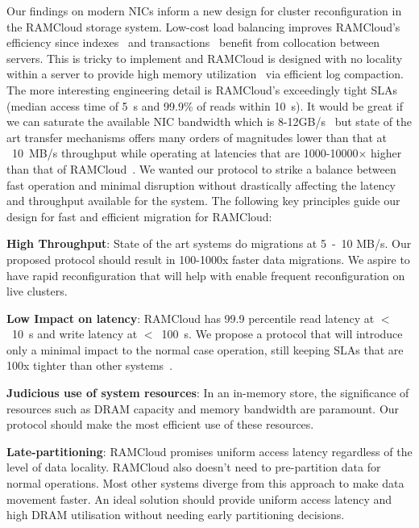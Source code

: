Our findings on modern NICs inform a new design for cluster reconfiguration
in the RAMCloud storage system. Low-cost load balancing improves RAMCloud’s
efficiency since indexes~\cite{slik} and transactions~\cite{ramcloudtx} benefit from collocation between servers.
This is tricky to implement and RAMCloud is designed with no locality within a 
server to provide high memory utilization~\cite{ramcloudfast} via efficient log compaction.
The more interesting engineering detail is RAMCloud’s exceedingly tight SLAs (median
access time of 5~\textmu s and 99.9\% of reads within 10~\textmu s). It would be great if we can saturate the
available NIC bandwidth which is 8-12GB/s~\cite{cx3,cx4} but state of the art 
transfer mechanisms offers many orders of magnitudes lower than that at ~10~MB/s 
throughput while operating at latencies that are 1000-10000$\times$ higher than that of RAMCloud~\cite{ramcloud}.
We wanted our protocol to strike a balance between fast operation and minimal disruption without drastically affecting
the latency and throughput available for the system. The following key principles guide our design for fast and 
efficient migration for RAMCloud:
\begin{myitemize}
\item{\textbf{High Throughput}}: State of the art systems do migrations at 5~-~10 MB/s. Our proposed protocol
should result in 100-1000x faster data migrations. We aspire to have rapid reconfiguration that will 
help with enable frequent reconfiguration on live clusters.
\item{\textbf{Low Impact on latency}}: RAMCloud has 99.9 percentile read latency at $<$~10~\textmu s \linebreak and write latency
at $<$~100~\textmu s. We propose a protocol that will introduce only a minimal impact to the normal case operation, still keeping
SLAs that are 100x tighter \linebreak than other systems~\cite{squall}.
\item{\textbf{Judicious use of system resources}}: In an in-memory store, the significance of \linebreak resources such as DRAM capacity and
memory bandwidth are paramount. Our \linebreak protocol should make the most efficient use of these resources.
\item{\textbf{Late-partitioning}}: RAMCloud promises uniform access latency regardless of the level of data locality.
RAMCloud also doesn't need to pre-partition data for normal operations. Most other systems diverge from this 
approach to make data movement faster. An ideal solution should provide uniform access latency and high DRAM utilisation 
without needing early partitioning decisions.
\end{myitemize}


